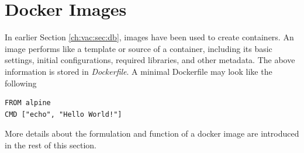 \section{Docker Images}

In earlier Section \ref{ch:vac:sec:db}, images have been used to create containers. An image performs like a template or source of a container, including its basic settings, initial configurations, required libraries, and other metadata. The above information is stored in \textit{Dockerfile}. A minimal Dockerfile may look like the following
\begin{lstlisting}
FROM alpine
CMD ["echo", "Hello World!"]
\end{lstlisting}
More details about the formulation and function of a docker image are introduced in the rest of this section.












